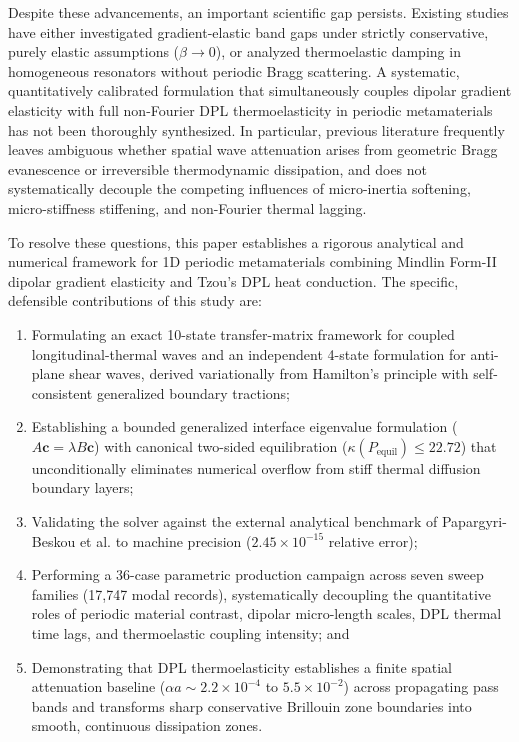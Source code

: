 \documentclass[11pt,a4paper]{article}
\begin{document}
Despite these advancements, an important scientific gap persists. Existing studies have either investigated gradient-elastic band gaps under strictly conservative, purely elastic assumptions ($\beta \to 0$), or analyzed thermoelastic damping in homogeneous resonators without periodic Bragg scattering. A systematic, quantitatively calibrated formulation that simultaneously couples dipolar gradient elasticity with full non-Fourier DPL thermoelasticity in periodic metamaterials has not been thoroughly synthesized. In particular, previous literature frequently leaves ambiguous whether spatial wave attenuation arises from geometric Bragg evanescence or irreversible thermodynamic dissipation, and does not systematically decouple the competing influences of micro-inertia softening, micro-stiffness stiffening, and non-Fourier thermal lagging.

To resolve these questions, this paper establishes a rigorous analytical and numerical framework for 1D periodic metamaterials combining Mindlin Form-II dipolar gradient elasticity and Tzou's DPL heat conduction. The specific, defensible contributions of this study are:
\begin{enumerate}
    \item Formulating an exact 10-state transfer-matrix framework for coupled longitudinal-thermal waves and an independent 4-state formulation for anti-plane shear waves, derived variationally from Hamilton's principle with self-consistent generalized boundary tractions;
    \item Establishing a bounded generalized interface eigenvalue formulation ($A\mathbf{c} = \lambda B\mathbf{c}$) with canonical two-sided equilibration ($\kappa(P_{\text{equil}}) \le 22.72$) that unconditionally eliminates numerical overflow from stiff thermal diffusion boundary layers;
    \item Validating the solver against the external analytical benchmark of Papargyri-Beskou et al. \cite{papargyribeskou2009wave} to machine precision ($2.45 \times 10^{-15}$ relative error);
    \item Performing a 36-case parametric production campaign across seven sweep families (17,747 modal records), systematically decoupling the quantitative roles of periodic material contrast, dipolar micro-length scales, DPL thermal time lags, and thermoelastic coupling intensity; and
    \item Demonstrating that DPL thermoelasticity establishes a finite spatial attenuation baseline ($\alpha a \sim 2.2 \times 10^{-4}$ to $5.5 \times 10^{-2}$) across propagating pass bands and transforms sharp conservative Brillouin zone boundaries into smooth, continuous dissipation zones.
\end{enumerate}
\end{document}
